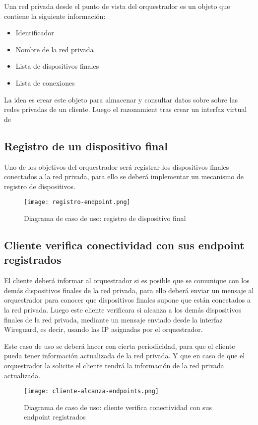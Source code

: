 Una red privada desde el punto de vista del orquestrador es un objeto que contiene la siguiente información:
\begin{itemize}
    \item Identificador
    \item Nombre de la red privada
    \item Lista de dispositivos finales
    \item Lista de conexiones
\end{itemize}

La idea es crear este objeto para almacenar y consultar datos sobre sobre las redes privadas de un cliente.
Luego el razonamient tras crear un interfaz virtual de



\subsection{Registro de un dispositivo final}
Uno de los objetivos del orquestrador será registrar los dispositivos finales conectados a la red privada, para ello se deberá implementar un mecanismo de registro de dispositivos.

\begin{figure}[h!]
    \centering
    \texttt{[image: registro-endpoint.png]}
    \caption{Diagrama de caso de uso: registro de dispositivo final}
\end{figure}


\subsection{Cliente verifica conectividad con sus endpoint registrados}
El cliente deberá informar al orquestrador si es posible que se comunique con los demás dispositivos finales de la red privada, para ello deberá enviar un mensaje al orquestrador para conocer que dispositivos finales supone que están conectados a la red privada.
Luego este cliente verificara si alcanza a los demás dispositivos finales de la red privada, mediante un mensaje enviado desde la interfaz Wireguard, es decir, usando las IP asignadas por el orquestrador.

Este caso de uso se deberá hacer con cierta periodicidad, para que el cliente pueda tener información actualizada de la red privada. Y que en caso de que el orquestrador la solicite el cliente tendrá la información de la red privada actualizada.

\begin{figure}[h!]
    \centering
    \texttt{[image: cliente-alcanza-endpoints.png]}
    \caption{Diagrama de caso de uso: cliente verifica conectividad con sus endpoint registrados}
\end{figure}


